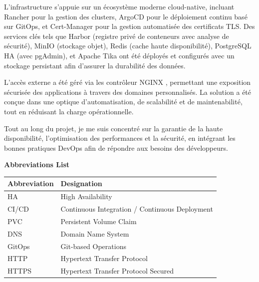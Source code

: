 \documentclass[a4paper,12pt]{report}
\begin{document}
\begin{doublespace}
\begin{doublespace}
{L’infrastructure s’appuie sur un écosystème moderne cloud-native, incluant Rancher pour la gestion des clusters, ArgoCD pour le déploiement continu basé sur GitOps, et Cert-Manager pour la gestion automatisée des certificats TLS. Des services clés tels que Harbor (registre privé de conteneurs avec analyse de sécurité), MinIO (stockage objet), Redis (cache haute disponibilité), PostgreSQL HA (avec pgAdmin), et Apache Tika ont été déployés et configurés avec un stockage persistant afin d’assurer la durabilité des données.

L’accès externe a été géré via les contrôleur NGINX , permettant une exposition sécurisée des applications à travers des domaines personnalisés. La solution a été conçue dans une optique d’automatisation, de scalabilité et de maintenabilité, tout en réduisant la charge opérationnelle.

Tout au long du projet, je me suis concentré sur la garantie de la haute disponibilité, l’optimisation des performances et la sécurité, en intégrant les bonnes pratiques DevOps afin de répondre aux besoins des développeurs.
}
\end{doublespace}
\end{doublespace}
\newpage
{}
{}

\begin{center}
\vspace{9cm}
    \textbf{\huge{Abbreviations List}}
\end{center}
\vspace{1cm}

\begin{doublespace}
\begin{center}
\begin{tabular}{|l|l|}
  \hline
  Abbreviation &  Designation \\
  \hline
  HA & High Availability \\
  \hline
  CI/CD & Continuous Integration / Continuous Deployment \\
  \hline
  PVC & Persistent Volume Claim \\
  \hline
  DNS & Domain Name System \\
  \hline
  GitOps & Git-based Operations \\
  \hline
  HTTP & Hypertext Transfer Protocol                   \\
  \hline
  HTTPS & Hypertext Transfer Protocol Secured \\
  \hline
\end{tabular}
\end{center}
\end{doublespace}
\end{document}
